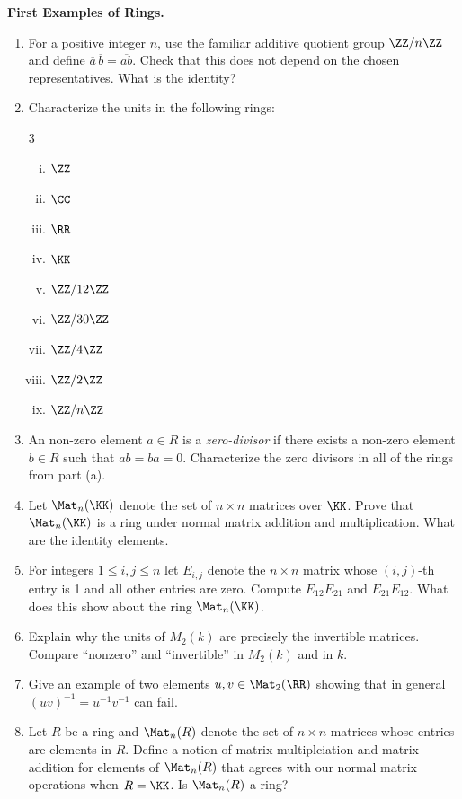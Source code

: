 \documentclass[12pt,reqno]{amsart}
\begin{document}
\begin{problems}
\item\label{r:examples} \textbf{First Examples of Rings.}
\begin{enumerate} 
\item For a positive integer $n$, use the familiar additive quotient group $\ZZ/n\ZZ$ and define $\overline a\,\overline b=\overline{ab}$. Check that this does not depend on the chosen representatives. What is the identity?
\item Characterize the units in the following rings:
\begin{multicols}{3}
\begin{enumerate}[(i)]
\item $\ZZ$
\item $\CC$
\item $\RR$ 
\item $\KK$
\item $\ZZ/12\ZZ$
\item $\ZZ/30\ZZ$ 
\item $\ZZ/4\ZZ$
\item $\ZZ/2\ZZ$
\item $\ZZ/n\ZZ$
\end{enumerate}
\end{multicols}
\item An non-zero element $a \in R$ is a \emph{zero-divisor} if there exists a non-zero element $b \in R$ such that $ab=ba=0$. Characterize the zero divisors in all of the rings from part (a). 
\item Let $\Mat_n(\KK)$ denote the set of $n\times n$ matrices over $\KK$. Prove that $\Mat_{n}(\KK)$ is a ring under normal matrix addition and multiplication. What are the identity elements. 
\item For integers $1\leq i,j\leq n$ let  $E_{i,j}$ denote the $n\times n$ matrix whose $(i,j)$-th entry is 1 and all other entries are zero. Compute $E_{12}E_{21}$ and $E_{21}E_{12}$. What does this show about the ring $\Mat_{n}(\KK)$. 
\item Explain why the units of $M_2(k)$ are precisely the invertible matrices. Compare ``nonzero'' and ``invertible'' in $M_2(k)$ and in $k$.
\item Give an example of two elements  $u,v \in \Mat_{2}(\RR)$ showing that in general $(uv)^{-1}=u^{-1}v^{-1}$ can fail.  
\item Let $R$ be a ring and $\Mat_n(R)$ denote the set of $n\times n$ matrices whose entries are elements in  $R$. Define a notion of matrix multiplciation and matrix addition for elements of  $\Mat_n(R)$ that agrees with our normal matrix operations when $R=\KK$. Is $\Mat_n(R)$ a ring?
\end{enumerate}
\end{problems}
\end{document}
